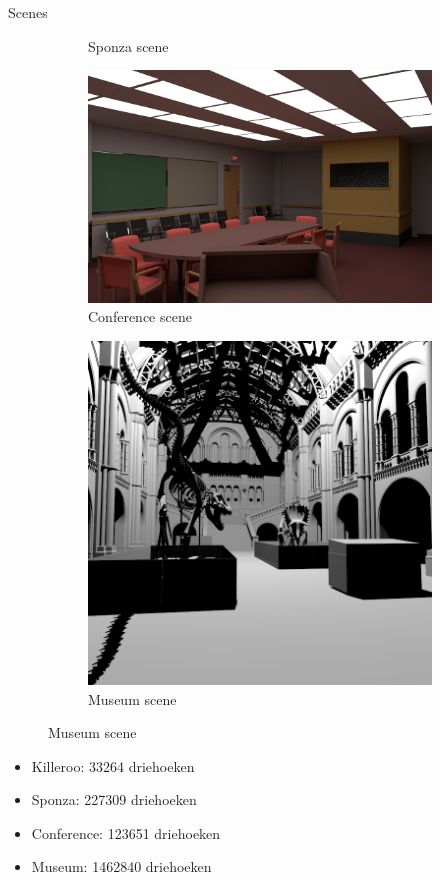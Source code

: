 \documentclass[11pt,t]{beamer}
\begin{document}
\begin{frame}{Scenes}
\begin{figure}
\begin{subfigure}[t]{0.20\textwidth}
		  \caption{Sponza scene}
		  \label{fig:results-scene-sponza}    
		\end{subfigure}
		\begin{subfigure}[t]{0.29\textwidth}
		  \centering
		  \includegraphics[width=1\linewidth]{../img/conferencehall}
		  \caption{Conference scene}
		  \label{fig:results-scene-conference}    
		\end{subfigure}
		\begin{subfigure}[t]{0.20\textwidth}
		  \centering
		  \includegraphics[width=1\linewidth]{../img/museum}
		  \caption{Museum scene}
		  \label{fig:results-scene-museum}    
		\end{subfigure}
	  \end{figure}
	  \begin{itemize}
		\item Killeroo: 33264 driehoeken
		\item Sponza: 227309 driehoeken
		\item Conference: 123651 driehoeken
		\item Museum: 1462840 driehoeken
	  \end{itemize}
\end{frame}
\end{document}
